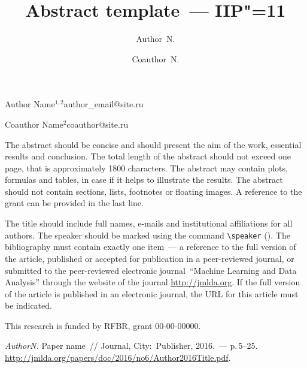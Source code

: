\documentclass[twoside]{article}
\begin{document}
\title{Abstract template~--- IIP"=11}
\author{Author~N.}{Author Name$^{1,2}$}{author\_email@site.ru}
\author{Coauthor~N.}{Coauthor Name$^2$\speaker}{coauthor@site.ru}
\English
\maketitle

The abstract should be concise and should present the aim of the work, essential results and conclusion.
The total length of the abstract should not exceed one page, that is approximately 1800 characters.
The abstract may contain plots, formulas and tables, in case if it helps to illustrate the results.
The abstract should not contain sections, lists, footnotes or floating images.
A reference to the grant can be provided in the last line.

The title should include full names, e-mails and institutional affiliations for all authors. The speaker should be marked using the command \verb|\speaker| (\speaker).
The bibliography must contain exactly one item~--- a reference to the full version of the article,
published or accepted for publication in a peer-reviewed journal,
or submitted to the peer-reviewed electronic journal~``Machine Learning and Data Analysis''
through the website of the journal \url{http://jmlda.org}.
If the full version of the article is published in an electronic journal, the URL for this article must be indicated.

This research is funded by RFBR, grant 00-00-00000.

\begin{thebibliography}{1}
    \emph{Author\;N.}
    Paper name~//
    Journal,
    City:~Publisher, 2016.~--- p.\,5--25.
    \url{http://jmlda.org/papers/doc/2016/no6/Author2016Title.pdf}.
\end{thebibliography}
\end{document}
